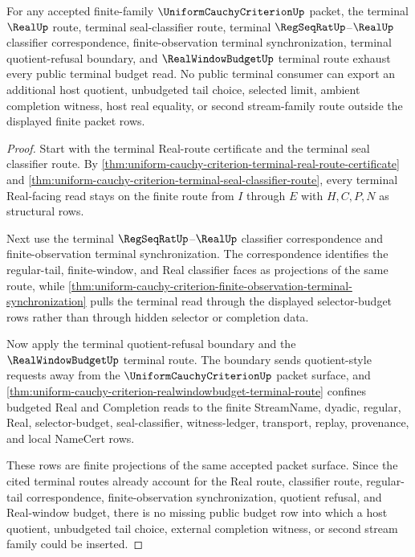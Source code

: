 \begin{theorem}
\label{thm:uniform-cauchy-criterion-finite-family-terminal-budget-exhaustion}
For any accepted finite-family $\UniformCauchyCriterionUp$ packet, the terminal $\RealUp$ route, terminal seal-classifier route, terminal $\RegSeqRatUp$--$\RealUp$ classifier correspondence, finite-observation terminal synchronization, terminal quotient-refusal boundary, and $\RealWindowBudgetUp$ terminal route exhaust every public terminal budget read. No public terminal consumer can export an additional host quotient, unbudgeted tail choice, selected limit, ambient completion witness, host real equality, or second stream-family route outside the displayed finite packet rows.
\end{theorem}
\begin{proof}
Start with the terminal Real-route certificate and the terminal seal classifier route. By \autoref{thm:uniform-cauchy-criterion-terminal-real-route-certificate} and \autoref{thm:uniform-cauchy-criterion-terminal-seal-classifier-route}, every terminal Real-facing read stays on the finite route from $I$ through $E$ with $H,C,P,N$ as structural rows.

Next use the terminal $\RegSeqRatUp$--$\RealUp$ classifier correspondence and finite-observation terminal synchronization. The correspondence identifies the regular-tail, finite-window, and Real classifier faces as projections of the same route, while \autoref{thm:uniform-cauchy-criterion-finite-observation-terminal-synchronization} pulls the terminal read through the displayed selector-budget rows rather than through hidden selector or completion data.

Now apply the terminal quotient-refusal boundary and the $\RealWindowBudgetUp$ terminal route. The boundary sends quotient-style requests away from the $\UniformCauchyCriterionUp$ packet surface, and \autoref{thm:uniform-cauchy-criterion-realwindowbudget-terminal-route} confines budgeted Real and Completion reads to the finite StreamName, dyadic, regular, Real, selector-budget, seal-classifier, witness-ledger, transport, replay, provenance, and local NameCert rows.

These rows are finite projections of the same accepted packet surface. Since the cited terminal routes already account for the Real route, classifier route, regular-tail correspondence, finite-observation synchronization, quotient refusal, and Real-window budget, there is no missing public budget row into which a host quotient, unbudgeted tail choice, external completion witness, or second stream family could be inserted.
\end{proof}



